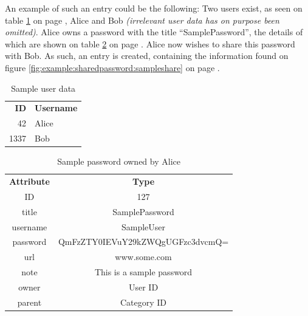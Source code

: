 			An example of such an entry could be the following: Two users exist, as seen on table \ref{fig:example:sharedpassword:users} on page \pageref{fig:example:sharedpassword:users}, Alice and Bob \emph{(irrelevant user data has on purpose been omitted)}. Alice owns a password with the title ``SamplePassword'', the details of which are shown on table \ref{fig:example:sharedpassword:samplepassword} on page \pageref{fig:example:sharedpassword:samplepassword}. Alice now wishes to share this password with Bob. As such, an entry is created, containing the information found on figure \ref{fig:example:sharedpassword:sampleshare} on page \pageref{fig:example:sharedpassword:sampleshare}.
			\begin{table}[p]
				\centering
				\begin{tabular}{r|l}
					\textbf{ID} 		& \textbf{Username} \\
					42 					& Alice 			\\
					1337  				& Bob 				\\
				\end{tabular}
				\caption{Sample user data}
				\label{fig:example:sharedpassword:users}
			\end{table}

			\begin{table}[p]
				\centering
				\begin{tabular}{c|c}
					\textbf{Attribute} 		& \textbf{Type} 											\\
					ID 						& 127 														\\
					title 					& SamplePassword 											\\
					username 				& SampleUser 												\\
					password 				& QmFzZTY0IEVuY29kZWQgUGFzc3dvcmQ= 							\\
					url						& www.some.com 												\\
					note  					& This is a sample password 								\\
					owner 					& User ID 													\\
					parent 					& Category ID 												\\
				\end{tabular}
				\caption{Sample password owned by Alice}
				\label{fig:example:sharedpassword:samplepassword}
			\end{table}

